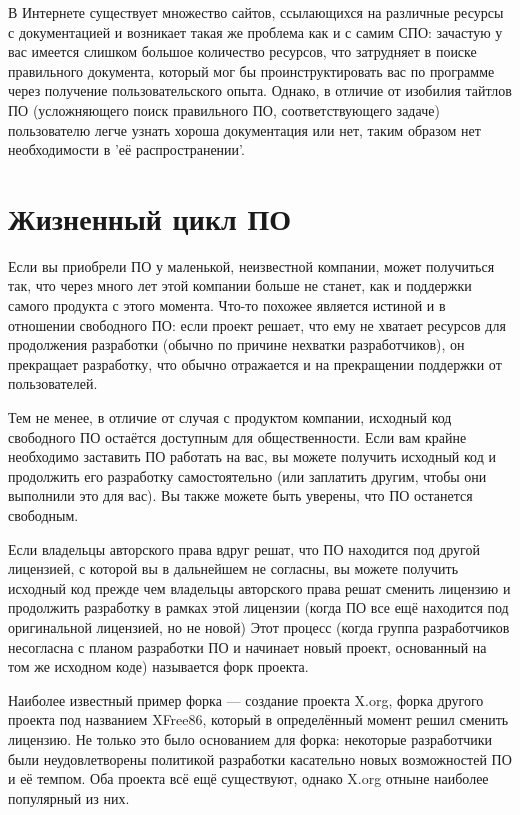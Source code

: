 \documentclass[10pt]{book}
\begin{document}
В Интернете существует множество сайтов, ссылающихся на различные ресурсы с документацией и возникает такая же проблема как и с самим СПО: зачастую у вас имеется слишком большое количество ресурсов, что затрудняет в поиске правильного документа, который мог бы проинструктировать вас по программе через получение пользовательского опыта. Однако, в отличие от изобилия тайтлов ПО (усложняющего поиск правильного ПО, соответствующего задаче) пользователю легче узнать хороша документация или нет, таким образом нет необходимости в 'её распространении'.

\section{Жизненный цикл ПО}

Если вы приобрели ПО у маленькой, неизвестной компании, может получиться так, что через много лет этой компании больше не станет, как и поддержки самого продукта с этого момента. Что-то похожее является истиной и в отношении   свободного ПО: если проект решает, что ему не хватает ресурсов для продолжения разработки (обычно по причине нехватки разработчиков), он прекращает разработку, что обычно отражается и на прекращении поддержки от пользователей.

Тем не менее, в отличие от случая с продуктом компании, исходный код свободного ПО остаётся доступным для общественности. Если вам крайне необходимо заставить ПО работать на вас, вы можете получить исходный код и продолжить его разработку самостоятельно (или заплатить другим, чтобы они выполнили это для вас). Вы также можете быть уверены, что ПО останется свободным. 

Если владельцы авторского права вдруг решат, что ПО находится под другой лицензией, с которой вы в дальнейшем не согласны, вы можете получить исходный код прежде чем владельцы авторского права решат сменить лицензию и продолжить разработку в рамках этой лицензии (когда ПО все ещё находится под оригинальной лицензией, но не новой) Этот процесс (когда группа разработчиков несогласна с планом разработки ПО и начинает новый проект, основанный на том же исходном коде) называется форк проекта.

Наиболее известный пример форка — создание проекта X.org, форка другого проекта под названием XFree86, который в определённый момент решил сменить лицензию. Не только это было основанием для форка: некоторые разработчики были неудовлетворены политикой разработки касательно новых возможностей ПО и её темпом. Оба проекта всё ещё существуют, однако X.org отныне наиболее популярный из них.
\end{document}
